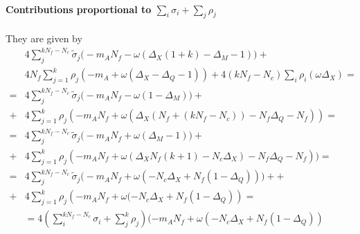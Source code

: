 \begin{appendices}
\paragraph{Contributions proportional to  $\sum_i \sigma_i + \sum_j \rho_j$}
They are given by
\begin{equation}
\begin{aligned}
  & 4 \sum_j^{k N_f - N_c} \tilde{\sigma}_j \big( - m_A N_f -  \omega( \Delta_X(1+k)  - \Delta_M - 1) \big) + \\ 
   & 4 N_f \sum_{j=1}^k  \rho_j ( - m_A +  \omega ( \Delta_X - \Delta_Q - 1) )  + 4 (k N_f - N_c)  \sum_i \rho_i(  \omega \Delta_X )  =  \\
  = & 4  \sum_j^{k N_f - N_c} \tilde{\sigma}_j \big( - m_A N_f -  \omega( 1 - \Delta_M) \big) + \\
  + & 4  \sum_{j=1}^k  \rho_j ( - m_A N_f  +  \omega ( \Delta_X( N_f + ( k N_f - N_c) ) - N_f \Delta_Q - N_f ) ) =  \\
    =& 4  \sum_j^{k N_f - N_c} \tilde{\sigma}_j \big( - m_A N_f + \omega(  \Delta_M -1 ) \big) +  \\
     +&4  \sum_{j=1}^k  \rho_j ( - m_A N_f  +  \omega ( \Delta_X N_f(k+1) - N_c \Delta_X ) - N_f \Delta_Q - N_f ) ) =  \\
    =& 4  \sum_j^{k N_f - N_c} \tilde{\sigma}_j \big( - m_A N_f +  \omega( - N_c \Delta_X + N_f ( 1 - \Delta_Q)) \big) + 
    + \\ + &  4  \sum_{j=1}^k  \rho_j \left( - m_A N_f  +  \omega (  - N_c \Delta_X  +N_f (1- \Delta_Q ) \right) =  \\
    & = 4 \left( \sum_i^{k N_f -N_c} \sigma_i + \sum_j^{k} \rho_j \right) ( - m_A N_f  +  \omega (  - N_c \Delta_X  +N_f (1- \Delta_Q ))
\end{aligned}
\end{equation}



\end{appendices}
